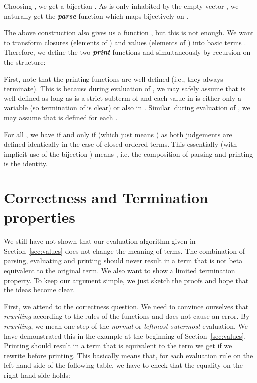 \documentclass[submission,copyright,creativecommons]{eptcs}
\newcommand{\define}[1]{\mbox{\textbf{\textit{#1}}}}
\begin{document}
Choosing , we get a bijection .  As  is
only inhabited by the empty vector , we naturally get the
\define{parse} function  which maps 
bijectively on .




The above construction also gives us a function , but this is not enough. We want to transform closures
(elements of ) and values (elements of ) 
into basic terms .
Therefore, we
define the two \define{print} functions  and  simultaneously by recursion on the structure:

First, note that the printing functions are well-defined (i.e., they always terminate). This is because during evaluation of , we may safely assume that  is well-defined as long as  is a strict subterm of  and each value  in  is either only a variable (so termination of  is clear) or also in . Similar, during evaluation of , we may assume that  is defined for each .

For all , we have  if and only if  (which just means ) as both judgements are defined identically in the case of closed ordered terms. This essentially (with implicit use of the bijection ) means , i.e. the composition of parsing and printing is the identity.






\section{Correctness and Termination properties}
\label{sec:sound}



We still have not shown that our evaluation algorithm given in Section~\ref{sec:values} does not change the meaning of terms. The combination of parsing, evaluating and printing should never result in a term that is not beta equivalent to the original term. We also want to show a limited termination property.
To keep our argument simple, we just sketch the proofs and hope that the ideas become clear.

First, we attend to the correctness question. 
We need to convince ourselves that \emph{rewriting} according to the rules of the functions  and  does not cause an error. 
By \emph{rewriting}, we mean one step of the \emph{normal} or \emph{leftmost outermost} evaluation. We have demonstrated this in the example at the beginning of Section~\ref{sec:values}.
Printing should result in a term that is  equivalent to the term we get if we rewrite before printing. 
This basically means that, for each evaluation rule on the left hand
side of the following table, we have to check that the equality on the
right hand side holds:
\end{document}
